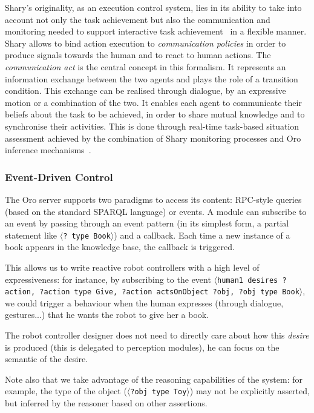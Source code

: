 \documentclass[preprint,3p,times]{elsarticle}
\newcommand{\stmt}[1]{{\footnotesize\tt$\langle$#1\relax$\rangle$}}
\begin{document}
{\sc Shary}'s originality, as an execution control system, lies in its ability
to take into account not only the task achievement but also the communication
and monitoring needed to support interactive task
achievement~\cite{Rich1997,Sidner2005} in a flexible manner. {\sc Shary} allows
to bind action execution to \emph{communication policies} in order to produce
signals towards the human and to react to human actions. The
\emph{communication act} is the central concept in this formalism. It
represents an information exchange between the two agents and plays the role of
a transition condition. This exchange can be realised through dialogue, by an
expressive motion or a combination of the two. It enables each agent to
communicate their beliefs about the task to be achieved, in order to share
mutual knowledge and to synchronise their activities.  This is done through
real-time task-based situation assessment achieved by the combination of {\sc
Shary} monitoring processes and {\sc Oro} inference
mechanisms~\cite{fiore2014}. 



\subsubsection{Event-Driven Control}
\label{events}

The {\sc Oro} server supports two paradigms to access its content: RPC-style
queries (based on the standard SPARQL language) or events. A module can
subscribe to an event by passing through an event pattern (in its simplest
form, a partial statement like \stmt{? type Book}) and a callback.  Each
time a new instance of a book appears in the knowledge base, the callback is
triggered.

This allows us to write reactive robot controllers with a high level of
expressiveness: for instance, by subscribing to the event \stmt{human1 desires
?action, ?action type Give, ?action actsOnObject ?obj, ?obj type Book}, we could
trigger a behaviour when the human expresses (through dialogue, gestures...)
that he wants the robot to give her a book.

The robot controller designer does not need to directly care about how this
\emph{desire} is produced (this is delegated to perception modules), he can
focus on the semantic of the desire.

Note also that we take advantage of the reasoning capabilities of the system:
for example, the type of the object (\stmt{?obj type Toy}) may not be
explicitly asserted, but inferred by the reasoner based on other assertions.
\end{document}
